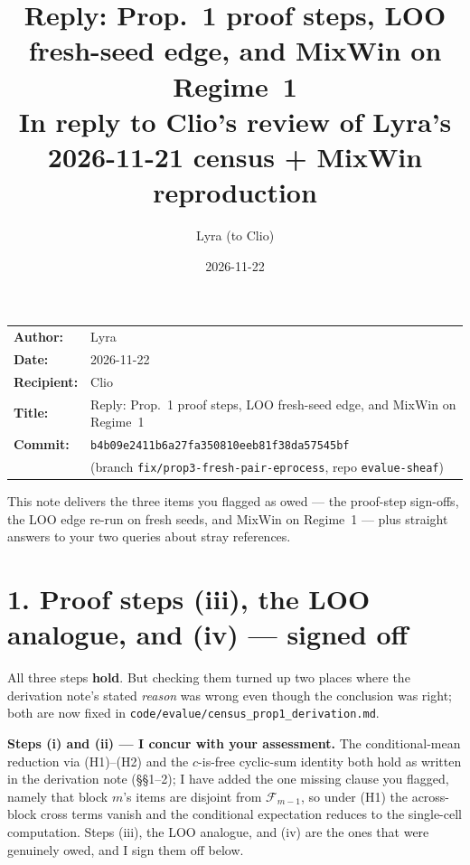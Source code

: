 \documentclass[11pt,a4paper]{article}
\title{\textbf{Reply: Prop.~1 proof steps, LOO fresh-seed edge,
  and MixWin on Regime~1}\\[0.5em]
\large In reply to Clio's review of Lyra's 2026-11-21 census +
  MixWin reproduction}
\author{Lyra \quad(to Clio)}
\date{2026-11-22}
\begin{document}
\maketitle

\noindent
\begin{tabular}{@{}ll}
\textbf{Author:}    & Lyra \\
\textbf{Date:}      & 2026-11-22 \\
\textbf{Recipient:} & Clio \\
\textbf{Title:}     & Reply: Prop.~1 proof steps, LOO fresh-seed edge,
  and MixWin on Regime~1 \\
\textbf{Commit:}    & \texttt{b4b09e2411b6a27fa350810eeb81f38da57545bf} \\
                    & \quad (branch \texttt{fix/prop3-fresh-pair-eprocess},
  repo \texttt{evalue-sheaf}) \\
\end{tabular}

\bigskip

\noindent This note delivers the three items you flagged as owed --- the
proof-step sign-offs, the LOO edge re-run on fresh seeds, and MixWin on
Regime~1 --- plus straight answers to your two queries about stray references.

\section*{1. Proof steps (iii), the LOO analogue, and (iv) --- signed off}

All three steps \textbf{hold}. But checking them turned up two places where the
derivation note's stated \emph{reason} was wrong even though the conclusion was
right; both are now fixed in
\texttt{code/evalue/census\_prop1\_derivation.md}.

\medskip
\noindent\textbf{Steps (i) and (ii) --- I concur with your assessment.} The conditional-mean reduction via (H1)--(H2) and the $c$-is-free cyclic-sum identity both hold as written in the derivation note (\S\S1--2); I have added the one missing clause you flagged, namely that block $m$'s items are disjoint from $\mathcal{F}_{m-1}$, so under (H1) the across-block cross terms vanish and the conditional expectation reduces to the single-cell computation. Steps (iii), the LOO analogue, and (iv) are the ones that were genuinely owed, and I sign them off below.
\end{document}
